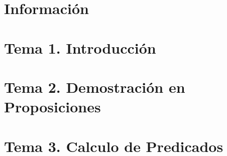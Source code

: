 \documentclass[12pt]{report} %
\begin{document}


\clearpage
{} %




\part{Información}


\part{Tema 1. Introducción}





\part{Tema 2. Demostración  en Proposiciones}








\part{Tema 3. Calculo de Predicados}




\end{document}
